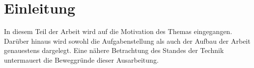 
\chapter{Einleitung}
\label{chap:Einleitung}
In diesem Teil der Arbeit wird auf die Motivation des Themas eingegangen. Darüber hinaus wird sowohl die Aufgabenstellung als auch der 
Aufbau der Arbeit genauestens dargelegt. Eine nähere Betrachtung des Standes der Technik untermauert die Beweggründe dieser Ausarbeitung.  

